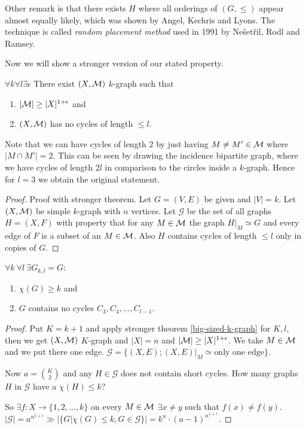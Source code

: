 Other remark is that there exists $H$ where all orderings of $(G, \leq)$ appear almost equally likely, which was shown by Angel, Kechris and Lyons. The technique is called \textit{random placement method} used in 1991 by Nešetřil, Rodl and Ramsey.

Now we will show a stronger version of our stated property.

\begin{thm}
	$\forall k \forall l \exists \epsilon$ There exist $(X, \mathcal{M})$ $k$-graph such that
	
	\begin{enumerate}
		\item $|\mathcal{M}| \geq |X|^{1 + \epsilon}$ and
		\item $(X, \mathcal{M})$ has no cycles of length $\leq l$.
	\end{enumerate}
	\label{big-sized-k-graph}
\end{thm}

Note that we can have cycles of length $2$ by just having $M \neq M' \in \mathcal{M}$ where $|M \cap M'| = 2$. This can be seen by drawing the incidence bipartite graph, where we have cycles of length $2l$ in comparison to the circles inside a $k$-graph. Hence for $l = 3$ we obtain the original statement.

\begin{proof}{Proof with stronger theorem.}
	Let $G = (V,E)$ be given and $|V| = k$. Let $(X, \mathcal{M})$ be simple $k$-graph with $n$ vertices. Let $\mathcal{G}$ be the set of all graphs $H = (X,F)$ with property that for any $M \in \mathcal{M}$ the graph $H|_M \simeq G$ and every edge of $F$ is a subset of an $M \in \mathcal{M}$. Also $H$ contains cycles of length $\leq l$ only in copies of $G$.
\end{proof}

\begin{thm}
	$\forall k \ \forall l \ \exists G_{k,l} = G$:
	
	\begin{enumerate}
		\item $\chi(G) \geq k$ and
		\item $G$ contains no cycles $C_3, C_4, \dots, C_{l-1}$.
	\end{enumerate}
\end{thm}

\begin{proof}
	Put $K = k+1$ and apply stronger theorem \ref{big-sized-k-graph} for $K,l$, then we get $(X, \mathcal{M})$ $K$-graph and $|X| = n$ and $|\mathcal{M}| \geq |X|^{1 + \epsilon}$. We take $M \in \mathcal{M}$ and we put there one edge. $\mathcal{G} = \{(X,E); (X,E)|_M \simeq \text{only one edge}\}$.
	
	Now $a = \binom{K}{2}$ and any $H \in \mathcal{G}$ does not contain short cycles. How many graphs $H$ in $\mathcal{G}$ have a $\chi(H) \leq k$?
	
	So $\exists f: X \to \{1, 2, \dots, k\}$ on every $M \in \mathcal{M}$ $\exists x \neq y$ such that $f(x) \neq f(y)$. $|\mathcal{G}| = a^{n^{1+\epsilon}} \gg |\{G | \chi(G) \leq k, G \in \mathcal{G}\}| = k^n \cdot (a-1)^{n^{1 + \epsilon}}$.
\end{proof}

